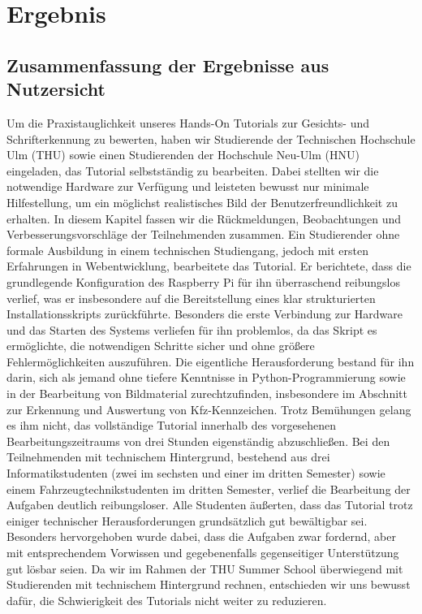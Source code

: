 \section{Ergebnis}
\subsection{Zusammenfassung der Ergebnisse aus Nutzersicht}
Um die Praxistauglichkeit unseres Hands-On Tutorials zur Gesichts- und Schrifterkennung zu bewerten, haben wir Studierende der Technischen Hochschule Ulm (THU) sowie einen Studierenden der Hochschule Neu-Ulm (HNU) eingeladen, das Tutorial selbstständig zu bearbeiten. Dabei stellten wir die notwendige Hardware zur Verfügung und leisteten bewusst nur minimale Hilfestellung, um ein möglichst realistisches Bild der Benutzerfreundlichkeit zu erhalten.
 In diesem Kapitel fassen wir die Rückmeldungen, Beobachtungen und Verbesserungsvorschläge der Teilnehmenden zusammen. \singlespacing
Ein Studierender ohne formale Ausbildung in einem technischen Studiengang, jedoch mit ersten Erfahrungen in Webentwicklung, bearbeitete das Tutorial.
Er berichtete, dass die grundlegende Konfiguration des Raspberry Pi für ihn überraschend reibungslos verlief, was er insbesondere auf die Bereitstellung eines klar strukturierten Installationsskripts zurückführte. Besonders die erste Verbindung zur Hardware und das Starten des Systems verliefen für ihn problemlos, da das Skript es ermöglichte, die notwendigen Schritte sicher und ohne größere Fehlermöglichkeiten auszuführen. Die eigentliche Herausforderung bestand für ihn darin, sich als jemand ohne tiefere Kenntnisse in Python-Programmierung sowie in der Bearbeitung von Bildmaterial zurechtzufinden, insbesondere im Abschnitt zur Erkennung und Auswertung von Kfz-Kennzeichen.
Trotz Bemühungen gelang es ihm nicht, das vollständige Tutorial innerhalb des vorgesehenen Bearbeitungszeitraums von drei Stunden eigenständig abzuschließen.
Bei den Teilnehmenden mit technischem Hintergrund, bestehend aus drei Informatikstudenten (zwei im sechsten und einer im dritten Semester) sowie einem Fahrzeugtechnikstudenten im dritten Semester, verlief die Bearbeitung der Aufgaben deutlich reibungsloser.
 Alle Studenten äußerten, dass das Tutorial trotz einiger technischer Herausforderungen grundsätzlich gut bewältigbar sei. Besonders hervorgehoben wurde dabei, dass die Aufgaben zwar fordernd, aber mit entsprechendem Vorwissen und gegebenenfalls gegenseitiger Unterstützung gut lösbar seien.
Da wir im Rahmen der THU Summer School überwiegend mit Studierenden mit technischem Hintergrund rechnen, entschieden wir uns bewusst dafür, die Schwierigkeit des Tutorials nicht weiter zu reduzieren.
